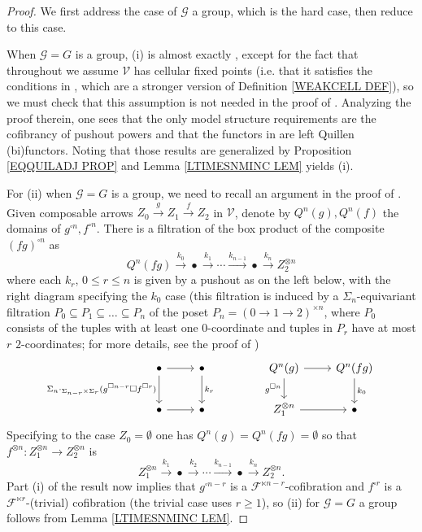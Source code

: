 \documentclass[a4paper,10pt
,draft
]{article}%
\numberwithin{equation}{section}
\numberwithin{figure}{section}
\theoremstyle{definition} %
\newcommand{\F}{\ensuremath{\mathcal F}}
\newcommand{\V}{\ensuremath{\mathcal V}}
\newcommand{\G}{\ensuremath{\mathcal G}}
\newcommand{\1}{\ensuremath{\mathbbm 1}}%
\begin{document}
\begin{proof}
We first address the case of $\G$ a group, 
which is the hard case, then reduce to this case.

When $\G = G$ is a group, 
(i) is almost exactly \cite[Prop. 6.24]{BP_geo}, 
except for the fact that throughout \cite{BP_geo}
we assume $\V$ has cellular fixed points
(i.e. that it satisfies the conditions in 
\cite[Prop. 2.6]{Ste16}, which are a stronger version of Definition \ref{WEAKCELL DEF}), 
so we must check that this assumption is not needed in the proof of 
\cite[Prop. 6.24]{BP_geo}.
Analyzing the proof therein, one sees that the only model structure requirements are the cofibrancy of pushout powers
and that the functors in 
\cite[Props 6.5 and 6.22]{BP_geo}
are left Quillen (bi)functors.
Noting that those results are generalized by Proposition \ref{EQQUILADJ PROP} and Lemma \ref{LTIMESNMINC LEM} yields (i).



For (ii) when $\G=G$ is a group, we need to recall an argument 
in the proof of \cite[Prop. 6.24]{BP_geo}. 
%
Given composable arrows $Z_0 \xrightarrow{g} Z_1 \xrightarrow{f} Z_2$ in $\V$,
denote by $Q^n(g), Q^n(f)$ the domains of $g^{\square n}, f^{\square n}$.
There is a filtration of the box product of the composite
$(fg)^{\square n}$ as
\[
	Q^n(fg)
\xrightarrow{k_0}
	\bullet
\xrightarrow{k_1}
	\cdots
\xrightarrow{k_{n-1}}
	\bullet
\xrightarrow{k_{n}}
	Z_2^{\otimes n}
\] 
where each $k_r$, $0\leq r \leq n$ is given by a pushout as on the left below, with the right diagram specifying the $k_0$ case
(this filtration is induced by a $\Sigma_n$-equivariant filtration 
$P_0 \subseteq P_1 \subseteq \dots \subseteq P_n$ of the poset $P_n = (0 \to 1 \to 2)^{\times n}$,
where $P_0$ consists of the tuples with at least one $0$-coordinate 
and tuples in $P_r$ have at most $r$ $2$-coordinates;
for more details, see the proof of \cite[Lemma 4.8]{Pe16})
\begin{equation}\label{HGBOX_EQ}
	\begin{tikzcd}
		\bullet 
		\arrow[d, "\Sigma_n \cdot_{\Sigma_{n-r} \times \Sigma_r} (g^{\square n-r} \square f^{\square r})"'] \arrow[r]
	&
		\bullet \arrow[d, "k_r"]
	& &%
		Q^n(g) \arrow[r] \arrow[d, "g^{\square n}"']
	&
		Q^n(fg) \arrow[d, "k_0"]
\\
		\bullet \arrow[r]
	&
		\bullet
	& &%
		Z_1^{\otimes n} \arrow[r]
	&
		\bullet
	\end{tikzcd}
\end{equation}
Specifying to the case $Z_0 = \emptyset$ one has
$Q^n(g)= Q^n(fg) = \emptyset$
so that $f^{\otimes n} \colon Z_1^{\otimes n} \to Z_2^{\otimes n}$
is
\[
	Z_1^{\otimes n}
\xrightarrow{k_1}
	\bullet
\xrightarrow{k_2}
	\cdots
\xrightarrow{k_{n-1}}
	\bullet
\xrightarrow{k_{n}}
	Z_2^{\otimes n}.
\] 
Part (i) of the result now implies that 
$g^{\square n-r}$
is a $\F^{\ltimes n-r}$-cofibration
and
$f^{\square r}$
is a $\F^{\ltimes r}$-(trivial) cofibration
(the trivial case uses $r\geq 1$),
so (ii) for $\G=G$ a group follows from 
Lemma \ref{LTIMESNMINC LEM}.



\end{proof}
\end{document}
